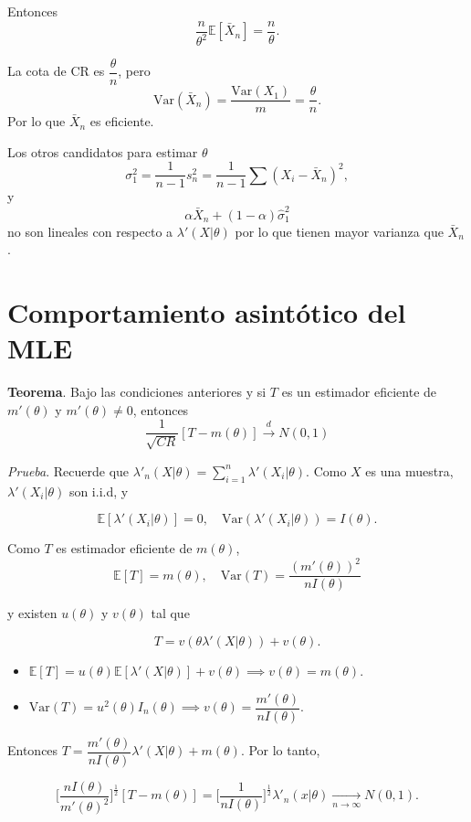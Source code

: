 \documentclass[
  12pt,
]{book}
\begin{document}
Entonces
\[\dfrac{n}{\theta^2}\mathbb E[\bar X_n] = \dfrac n{\theta}.\]

La cota de CR es \(\dfrac \theta n\), pero
\[\text{Var}(\bar X_n) = \dfrac{\text{Var}(X_1)}{m} = \dfrac \theta n.\]
Por lo que \(\bar X_n\) es eficiente.

Los otros candidatos para estimar \(\theta\)
\[\sigma_1^2=\dfrac 1{n-1}s_n^2 = \dfrac 1{n-1}\sum (X_i-\bar X_n)^2,\]
y
\[\alpha \bar X_n + (1-\alpha)\hat\sigma^2_1\]
no son lineales con respecto a \(\lambda'(X|\theta)\) por lo que tienen mayor varianza que \(\bar X_n\).

\hypertarget{comportamiento-asintuxf3tico-del-mle}{%
\section{Comportamiento asintótico del MLE}\label{comportamiento-asintuxf3tico-del-mle}}

\textbf{Teorema}. Bajo las condiciones anteriores y si \(T\) es un estimador eficiente de \(m'(\theta)\) y \(m'(\theta) \neq 0\), entonces
\[\dfrac 1{\sqrt{CR}}[T-m(\theta)]\xrightarrow{d}N(0,1)\]

\emph{Prueba}. Recuerde que \(\lambda'_n(X|\theta) = \sum_{i=1}^n\lambda'(X_i|\theta)\). Como \(X\) es una muestra, \(\lambda'(X_i|\theta)\) son i.i.d, y

\[\mathbb E[\lambda'(X_i|\theta)] = 0, \quad \text{Var}(\lambda'(X_i|\theta)) = I(\theta).\]

Como \(T\) es estimador eficiente de \(m(\theta)\),
\[\mathbb E[T] = m(\theta), \quad \text{Var}(T) = \dfrac{(m'(\theta))^2}{nI(\theta)}\]

y existen \(u(\theta)\) y \(v(\theta)\) tal que

\[T = v(\theta \lambda'(X|\theta)) + v(\theta).\]

\begin{itemize}
\item
  \(\mathbb E [T]= u(\theta)\mathbb E[\lambda'(X|\theta)] + v(\theta) \implies v(\theta) = m(\theta)\).
\item
  \(\text{Var}(T) = u^2(\theta)I_n(\theta) \implies v(\theta) = \dfrac{m'(\theta)}{nI(\theta)}\).
\end{itemize}

Entonces \(T = \dfrac{m'(\theta)}{nI(\theta)}\lambda'(X|\theta) + m(\theta)\). Por lo tanto,

\[\bigg[\dfrac{nI(\theta)}{m'(\theta)^2}\bigg]^{\frac 12}[T-m(\theta)] = \bigg[\dfrac 1 {nI(\theta)}\bigg]^{\frac 12}\lambda'_n(x|\theta) \xrightarrow[n\to\infty]{} N(0,1).\]
\end{document}
